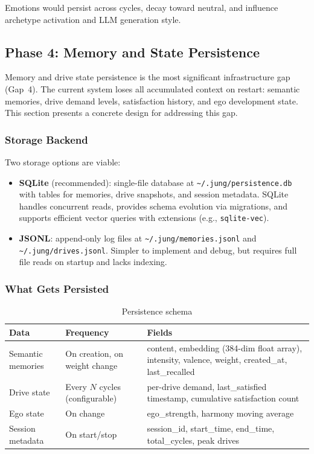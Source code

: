 \documentclass[11pt,oneside]{article}
\begin{document}
Emotions would persist across cycles, decay toward neutral, and influence archetype activation and LLM generation style.

\subsection{Phase 4: Memory and State Persistence}
\label{sec:persistence-design}

Memory and drive state persistence is the most significant infrastructure gap (Gap~4).
The current system loses all accumulated context on restart: semantic memories, drive demand levels, satisfaction history, and ego development state.
This section presents a concrete design for addressing this gap.

\subsubsection{Storage Backend}

Two storage options are viable:

\begin{itemize}
  \item \textbf{SQLite} (recommended): single-file database at \texttt{\~{}/.jung/persistence.db} with tables for memories, drive snapshots, and session metadata.
        SQLite handles concurrent reads, provides schema evolution via migrations, and supports efficient vector queries with extensions (e.g., \texttt{sqlite-vec}).
  \item \textbf{JSONL}: append-only log files at \texttt{\~{}/.jung/memories.jsonl} and \texttt{\~{}/.jung/drives.jsonl}.
        Simpler to implement and debug, but requires full file reads on startup and lacks indexing.
\end{itemize}

\subsubsection{What Gets Persisted}

\begin{table}[H]
\centering
\caption{Persistence schema}
\label{tab:persistence}
\small
\begin{tabularx}{\textwidth}{l l X}
\toprule
\textbf{Data} & \textbf{Frequency} & \textbf{Fields} \\
\midrule
Semantic memories & On creation, on weight change & content, embedding (384-dim float array), intensity, valence, weight, created\_at, last\_recalled \\
Drive state       & Every $N$ cycles (configurable) & per-drive demand, last\_satisfied timestamp, cumulative satisfaction count \\
Ego state         & On change & ego\_strength, harmony moving average \\
Session metadata  & On start/stop & session\_id, start\_time, end\_time, total\_cycles, peak drives \\
\bottomrule
\end{tabularx}
\end{table}
\end{document}
